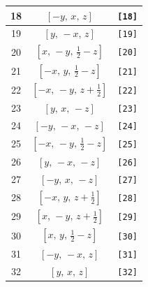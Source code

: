 \documentclass[fleqn,8pt]{jsarticle}
\begin{document}
\begin{longtable}{ccc}
18 & $\left[ - y,\, x,\, z \right]$ & {\tt [18]} \\ \hline
19 & $\left[ y,\, - x,\, z \right]$ & {\tt [19]} \\ \hline
20 & $\left[ x,\, - y,\, \frac{1}{2} - z \right]$ & {\tt [20]} \\ \hline
21 & $\left[ - x,\, y,\, \frac{1}{2} - z \right]$ & {\tt [21]} \\ \hline
22 & $\left[ - x,\, - y,\, z + \frac{1}{2} \right]$ & {\tt [22]} \\ \hline
23 & $\left[ y,\, x,\, - z \right]$ & {\tt [23]} \\ \hline
24 & $\left[ - y,\, - x,\, - z \right]$ & {\tt [24]} \\ \hline
25 & $\left[ - x,\, - y,\, \frac{1}{2} - z \right]$ & {\tt [25]} \\ \hline
26 & $\left[ y,\, - x,\, - z \right]$ & {\tt [26]} \\ \hline
27 & $\left[ - y,\, x,\, - z \right]$ & {\tt [27]} \\ \hline
28 & $\left[ - x,\, y,\, z + \frac{1}{2} \right]$ & {\tt [28]} \\ \hline
29 & $\left[ x,\, - y,\, z + \frac{1}{2} \right]$ & {\tt [29]} \\ \hline
30 & $\left[ x,\, y,\, \frac{1}{2} - z \right]$ & {\tt [30]} \\ \hline
31 & $\left[ - y,\, - x,\, z \right]$ & {\tt [31]} \\ \hline
32 & $\left[ y,\, x,\, z \right]$ & {\tt [32]} \\
\end{longtable}
\end{document}
